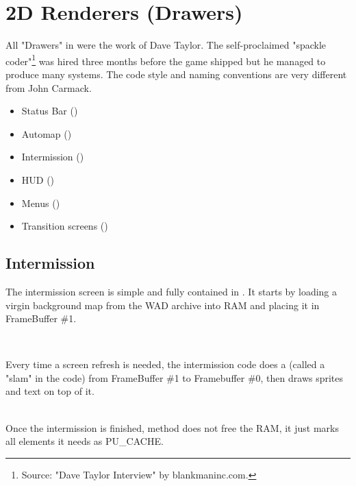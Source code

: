 
\section{2D Renderers (Drawers)}
All "Drawers" in \doom{} were the work of  Dave Taylor. The self-proclaimed "spackle coder"\footnote{Source: "Dave Taylor Interview" by blankmaninc.com.} was hired three months before the game shipped but he managed to produce many systems. The code style and naming conventions are very different from John Carmack.
\begin{itemize}
\item Status Bar ()
\item Automap ()
\item Intermission ()
\item HUD ()
\item Menus ()
\item Transition screens ()
\end{itemize} 
\par




\subsection{Intermission}
The intermission screen is simple and fully contained in . It starts by loading a virgin background map from the WAD archive into RAM and placing it in FrameBuffer \#1.\\
\par
{}\\
\par
Every time a screen refresh is needed, the intermission code does a  (called a "slam" in the code) from FrameBuffer \#1 to Framebuffer \#0, then draws sprites and text on top of it.\\
\par
{}\\

Once the intermission is finished, method  does not free the RAM, it just marks all elements it needs as PU\_CACHE.\\




\par

